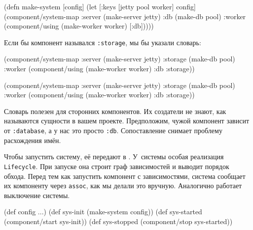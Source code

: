 \else

\begin{english}
  \begin{clojure}
(defn make-system
  [config]
  (let [{:keys [jetty pool worker]} config]
    (component/system-map
     :server (make-server jetty)
     :db     (make-db pool)
     :worker (component/using
              (make-worker worker) [:db]))))
  \end{clojure}
\end{english}

\fi


\noindent
Если бы компонент назывался \verb|:storage|, мы бы указали словарь:

\pagebreaklarge

\ifnarrow

\begin{english}
  \begin{clojure}
(component/system-map
 :server  (make-server jetty)
 :storage (make-db pool)
 :worker  (component/using
            (make-worker worker)
            {:db :storage}))
  \end{clojure}
\end{english}

\else

\begin{english}
  \begin{clojure}
(component/system-map
 :server  (make-server jetty)
 :storage (make-db pool)
 :worker  (component/using
           (make-worker worker) {:db :storage}))
  \end{clojure}
\end{english}

\fi

Словарь полезен для сторонних компонентов. Их создатели не знают, как называются
сущности в вашем проекте. Предположим, чужой компонент зависит от
\verb|:database|, а у нас это просто \verb|:db|. Сопоставление снимает проблему
расхождения имён.

Чтобы запустить систему, её передают в . У~системы
особая реализация \verb|Lifecycle|. При запуске она строит граф зависимостей и
выводит порядок обхода. Перед тем как запустить компонент с зависимостями,
система сообщает их компоненту через \verb|assoc|, как мы делали это
вручную. Аналогично работает выключение системы.

\ifnarrow

\begin{english}
  \begin{clojure}
(def config {...})
(def sys-init (make-system config))
(def sys-started
  (component/start sys-init))
(def sys-stopped
  (component/stop sys-started))
  \end{clojure}
\end{english}

